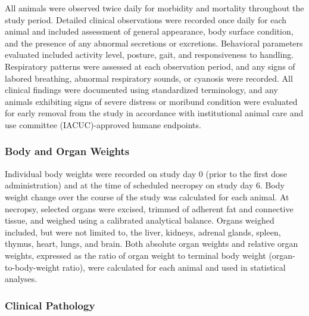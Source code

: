 All animals were observed twice daily for morbidity and mortality throughout the study period. Detailed clinical observations were recorded once daily for each animal and included assessment of general appearance, body surface condition, and the presence of any abnormal secretions or excretions. Behavioral parameters evaluated included activity level, posture, gait, and responsiveness to handling. Respiratory patterns were assessed at each observation period, and any signs of labored breathing, abnormal respiratory sounds, or cyanosis were recorded. All clinical findings were documented using standardized terminology, and any animals exhibiting signs of severe distress or moribund condition were evaluated for early removal from the study in accordance with institutional animal care and use committee (IACUC)-approved humane endpoints.

\subsubsection{Body and Organ Weights}

Individual body weights were recorded on study day 0 (prior to the first dose administration) and at the time of scheduled necropsy on study day 6. Body weight change over the course of the study was calculated for each animal. At necropsy, selected organs were excised, trimmed of adherent fat and connective tissue, and weighed using a calibrated analytical balance. Organs weighed included, but were not limited to, the liver, kidneys, adrenal glands, spleen, thymus, heart, lungs, and brain. Both absolute organ weights and relative organ weights, expressed as the ratio of organ weight to terminal body weight (organ-to-body-weight ratio), were calculated for each animal and used in statistical analyses.

\subsubsection{Clinical Pathology}

